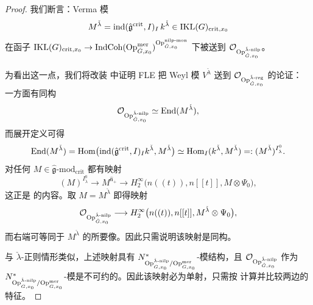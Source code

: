 \begin{proof}
我们断言：Verma 模
\[
M^{\check\lambda}=\mathrm{ind}(\hat{\mathfrak{g}}^{\mathrm{crit}},I)_I\,
k^{\check\lambda}\in \mathrm{IKL}(G)_{\mathrm{crit},x_0}
\]
在函子
$\mathrm{IKL}(G)_{\mathrm{crit},x_0}\to
\mathrm{IndCoh}(\mathrm{Op}^{\mathrm{mer}}_{\check G,x_0})^{\mathrm{Op}^{\mathrm{nilp\text{-}mon}}_{\check G,x_0}}$
下被送到
$\mathcal{O}_{\mathrm{Op}^{\check\lambda\text{-}\mathrm{nilp}}_{\check G,x_0}}$。

为看出这一点，我们将改装 \cite{FG10} 中证明 FLE 把 Weyl 模 $V^{\check\lambda}$ 送到
$\mathcal{O}_{\mathrm{Op}^{\check\lambda\text{-}\mathrm{reg}}_{\check G,x_0}}$ 的论证：
一方面有同构
\[
\mathcal{O}_{\mathrm{Op}^{\check\lambda\text{-}\mathrm{nilp}}_{\check G,x_0}}
\simeq \operatorname{End}(M^{\check\lambda}),
\]
而展开定义可得
\[
\operatorname{End}(M^{\check\lambda})
=\operatorname{Hom}\bigl(\mathrm{ind}(\hat{\mathfrak{g}}^{\mathrm{crit}},I)_I k^{\check\lambda},
M^{\check\lambda}\bigr)
\simeq \operatorname{Hom}_I(k^{\check\lambda},M^{\check\lambda})
=:(M^{\check\lambda})^{I^0_{\check\lambda}}.
\]
对任何 $M\in \hat{\mathfrak{g}}\text{-}\mathrm{mod}_{\mathrm{crit}}$ 都有映射
\[
(M)^{I^0_{\check\lambda}}\longrightarrow M^{\hat{\mathfrak{n}}_+}
\longrightarrow H^{\infty}_2\bigl(n((t)),n[[t]],M\otimes \Psi_0\bigr),
\]
这正是 \cite[引理 3]{FG10} 的内容。取 $M=M^{\check\lambda}$ 即得映射
\[
\mathcal{O}_{\mathrm{Op}^{\check\lambda\text{-}\mathrm{nilp}}_{\check G,x_0}}
\longrightarrow
H^{\infty}_2\bigl(n((t)),n[[t]],M^{\check\lambda}\otimes \Psi_0\bigr),
\]
而右端可等同于 $M^{\check\lambda}$ 的所要像。因此只需说明该映射是同构。

与 $\check\lambda$-正则情形类似，上述映射具有
$N^{*}_{\mathrm{Op}^{\check\lambda\text{-}\mathrm{nilp}}_{\check G,x_0}/
\mathrm{Op}^{\mathrm{mer}}_{\check G,x_0}}$-模结构，且
$\mathcal{O}_{\mathrm{Op}^{\check\lambda\text{-}\mathrm{nilp}}_{\check G,x_0}}$ 作为
$N^{*}_{\mathrm{Op}^{\check\lambda\text{-}\mathrm{nilp}}_{\check G,x_0}/
\mathrm{Op}^{\mathrm{mer}}_{\check G,x_0}}$-模是不可约的。因此该映射必为单射，只需按
\cite[第 5 节]{FG10} 计算并比较两边的特征。


\end{proof}
